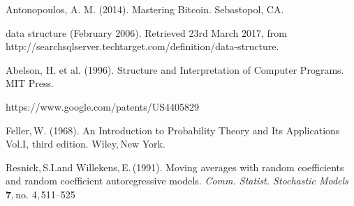 \begin{thebibliography}{99}



{\sc Antonopoulos, A. M.} (2014).
Mastering Bitcoin.
{\em} Sebastopol, CA.

{\sc data structure} (February 2006). Retrieved 23rd March 2017, from http://searchsqlserver.techtarget.com/definition/data-structure.

{\sc Abelson, H. et al.} (1996).
Structure and Interpretation of Computer Programs.
MIT Press.

https://www.google.com/patents/US4405829


{\sc Feller,\,W.} (1968).
An Introduction to Probability Theory and Its Applications Vol.I, third edition.
{\em}Wiley,\,New York.

{\sc Resnick,\,S.I.and Willekens,\,E.}\,(1991).
Moving averages with random coefficients and random coefficient autoregressive models.
{\em Comm. Statist. Stochastic Models} \,{\bf 7},\,no. 4,\,511--525

\end{thebibliography}
